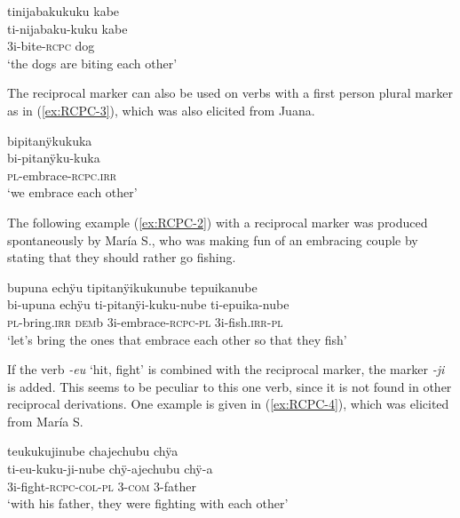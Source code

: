 \ea\label{ex:RCPC-el}
\begingl
\glpreamble tinijabakukuku kabe\\
\gla ti-nijabaku-kuku kabe\\
\glb 3i-bite-\textsc{rcpc} dog\\
\glft ‘the dogs are biting each other’
\endgl
\trailingcitation{[jxx-e081025s-1.571]}
\xe

The reciprocal marker can also be used on verbs with a first person plural marker as in (\ref{ex:RCPC-3}), which was also elicited from Juana.

\ea\label{ex:RCPC-3}
\begingl
\glpreamble bipitanÿkukuka\\
\gla bi-pitanÿku-kuka\\
\textsc{pl}-embrace-\textsc{rcpc.irr}\\
\glft ‘we embrace each other’
\endgl
\trailingcitation{[jxx-e150925l-1.114]}
\xe


The following example (\ref{ex:RCPC-2}) with a reciprocal marker was produced spontaneously by María S., who was making fun of an embracing couple by stating that they should rather go fishing.

\ea\label{ex:RCPC-2}
\begingl
\glpreamble bupuna echÿu tipitanÿikukunube tepuikanube\\
\gla bi-upuna echÿu ti-pitanÿi-kuku-nube ti-epuika-nube\\
\textsc{pl}-bring.\textsc{irr} \textsc{dem}b 3i-embrace-\textsc{rcpc}-\textsc{pl} 3i-fish.\textsc{irr}-\textsc{pl}\\
\glft ‘let’s bring the ones that embrace each other so that they fish’
\endgl
{}
\xe

If the verb \textit{-eu} ‘hit, fight’ is combined with the reciprocal marker, the  marker \textit{-ji} is added. This seems to be peculiar to this one verb, since it is not found in other reciprocal derivations. One example is given in (\ref{ex:RCPC-4}), which was elicited from María S.

\ea\label{ex:RCPC-4}
\begingl
\glpreamble teukukujinube chajechubu chÿa\\
\gla ti-eu-kuku-ji-nube chÿ-ajechubu chÿ-a\\
\glb 3i-fight-\textsc{rcpc}-\textsc{col}-\textsc{pl} 3-\textsc{com} 3-father\\
\glft ‘with his father, they were fighting with each other’
\endgl
\trailingcitation{[rxx-e141230s.195]}
\xe

